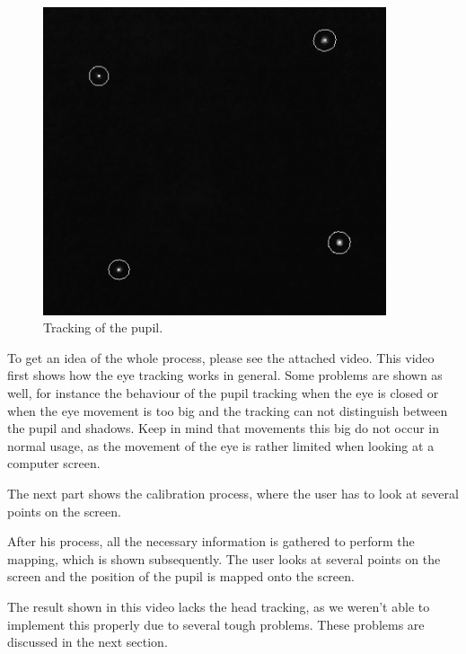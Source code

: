 \begin{figure}[H]
  \centering
  \includegraphics[width=0.9\textwidth]{fin_head.png}
  \caption{Tracking of the pupil.}\label{fig:pupil1}
\end{figure}

To get an idea of the whole process, please see the attached video. This video first shows how the eye tracking works in general. Some problems are shown as well, for instance the behaviour of the pupil tracking when the eye is closed or when the eye movement is too big and the tracking can not distinguish between the pupil and shadows. Keep in mind that movements this big do not occur in normal usage, as the movement of the eye is rather limited when looking at a computer screen.

The next part shows the calibration process, where the user has to look at several points on the screen.

After his process, all the necessary information is gathered to perform the mapping, which is shown subsequently. The user looks at several points on the screen and the position of the pupil is mapped onto the screen. 

The result shown in this video lacks the head tracking, as we weren't able to implement this properly due to several tough problems. These problems are discussed in the next section.


